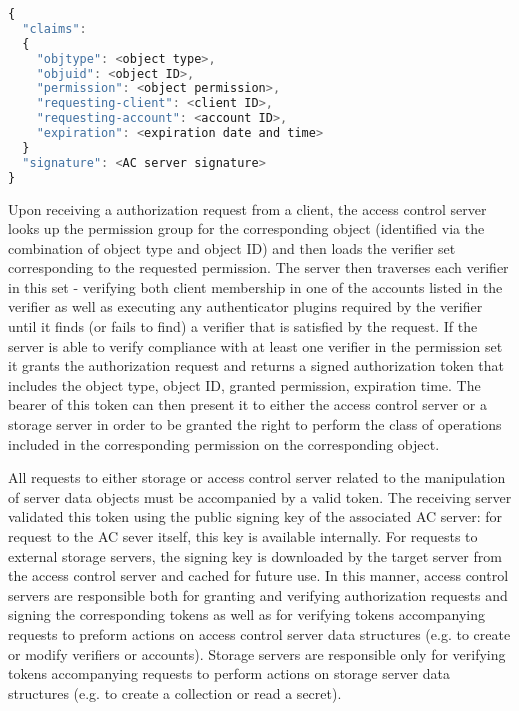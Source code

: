 \begin{lstlisting}[float,
    language=JavaScript,
    caption={Authorization Token Contents},
    label=lst:tutamen:token]
{
  "claims":
  {
    "objtype": <object type>,
    "objuid": <object ID>,
    "permission": <object permission>,
    "requesting-client": <client ID>,
    "requesting-account": <account ID>,
    "expiration": <expiration date and time>
  }
  "signature": <AC server signature>
}
\end{lstlisting}

Upon receiving a authorization request from a client, the access
control server looks up the permission group for the corresponding
object (identified via the combination of object type and object ID)
and then loads the verifier set corresponding to the requested
permission. The server then traverses each verifier in this set -
verifying both client membership in one of the accounts listed in the
verifier as well as executing any authenticator plugins required by
the verifier until it finds (or fails to find) a verifier that is
satisfied by the request. If the server is able to verify compliance
with at least one verifier in the permission set it grants the
authorization request and returns a signed authorization token that
includes the object type, object ID, granted permission, expiration
time. The bearer of this token can then present it to either the
access control server or a storage server in order to be granted the
right to perform the class of operations included in the corresponding
permission on the corresponding object.

All requests to either storage or access control server related to the
manipulation of server data objects must be accompanied by a valid
token. The receiving server validated this token using the public
signing key of the associated AC server: for request to the AC sever
itself, this key is available internally. For requests to external
storage servers, the signing key is downloaded by the target server
from the access control server and cached for future use. In this
manner, access control servers are responsible both for granting and
verifying authorization requests and signing the corresponding tokens
as well as for verifying tokens accompanying requests to preform
actions on access control server data structures (e.g. to create or
modify verifiers or accounts). Storage servers are responsible only
for verifying tokens accompanying requests to perform actions on
storage server data structures (e.g. to create a collection or read a
secret).

